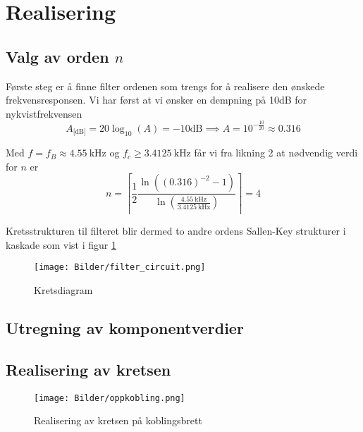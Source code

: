 \section{Realisering}
\label{realisering}
\subsection{Valg av orden $n$}
Første steg er å finne filter ordenen som trengs for å realisere den ønskede frekvensresponsen. Vi har først at vi 
ønsker en dempning på 10dB for nykvistfrekvensen
\[
    A_{\text{[dB]}} = 20 \log_{10}(A) = -10\text{dB} \implies A = 10^{-\frac{10}{20}} \approx 0.316
\]

Med $f = f_B \approx \SI{4.55}{\kilo\hertz}$ og $f_c \geq \SI{3.4125}{\kilo\hertz}$ får vi fra likning 2 at nødvendig 
verdi for $n$ er
\[
    n = \left\lceil\frac{1}{2}\frac{\ln{\left((0.316)^{-2} - 1\right)}}{\ln{\left(\frac{\SI{4.55}{\kilo\hertz}}{\SI{3.4125}{\kilo\hertz}}\right)}}\right\rceil = 4
\]

Kretsstrukturen til filteret blir dermed to andre ordens Sallen-Key strukturer i kaskade som vist i figur \ref{fig:filter-circuit}
\begin{figure}[H]
    \centering
    \texttt{[image: Bilder/filter\_circuit.png]}
    \caption{Kretsdiagram}
    \label{fig:filter-circuit}
\end{figure}

\subsection{Utregning av komponentverdier}

\subsection{Realisering av kretsen}
\begin{figure}[H]
    \centering
    \texttt{[image: Bilder/oppkobling.png]}
    \caption{Realisering av kretsen på koblingsbrett}
    \label{fig:realisering-img}
\end{figure}
